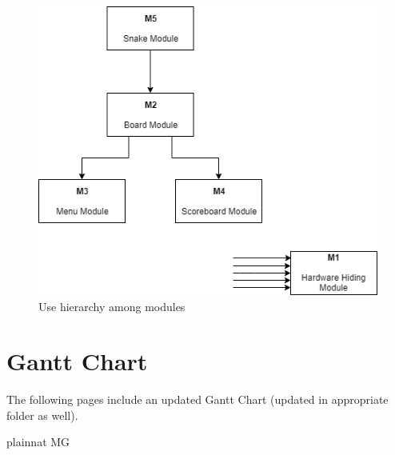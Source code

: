 \documentclass[12pt, titlepage]{article}
\begin{document}
\begin{figure}[H]
\centering
\includegraphics[width=1.0\textwidth]{UsesHierarchy.png}
\caption{Use hierarchy among modules}
\label{FigUH}
\end{figure}

\section{Gantt Chart}
\label{gantt}
The following pages include an updated Gantt Chart (updated in appropriate folder as well).



 {plainnat}
 {MG}
\end{document}
